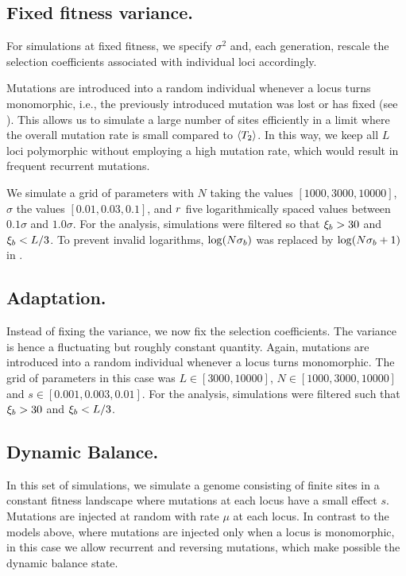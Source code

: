\subsection*{Fixed fitness variance.~}
For simulations at fixed fitness, we specify $\sigma^2$ and, each generation, rescale
the selection coefficients associated with individual loci accordingly.

Mutations are introduced into a random individual whenever a locus
turns monomorphic, i.e., the previously introduced mutation was lost
or has fixed (see \cite{Neher:2011p42539}). This allows us to simulate
a large number of sites efficiently in a limit where the overall
mutation rate is small compared to $\langle T_2\rangle$. In this way, we keep all $L$ loci
polymorphic without employing a high mutation rate, which would result
in frequent recurrent mutations.

We simulate a grid of parameters with $N$ taking the values $[1000,
3000, 10000]$, $\sigma$ the values $[0.01, 0.03, 0.1]$, and $r$ five
logarithmically spaced values between $0.1\sigma$ and $1.0 \sigma$. For the
analysis, simulations were filtered so that ${\xi_b}>30$ and
${\xi_b}<L/3$. To prevent invalid logarithms, $\log(N{\sigma_b})$ was
replaced by $\log(N{\sigma_b}+1)$ in .


\subsection*{Adaptation.~}
Instead of fixing the variance, we now fix the selection
coefficients. The variance is hence a fluctuating but roughly constant
quantity. Again, mutations are introduced into a random individual
whenever a locus turns monomorphic. 
The grid of parameters in this case was $L\in [3000, 10000]$, $N\in
[1000,3000, 10000]$ and $s \in [0.001, 0.003, 0.01]$. For the
analysis, simulations were filtered such that ${\xi_b}>30$ and
${\xi_b}<L/3$. 





\subsection*{Dynamic Balance.~}
In this set of simulations, we simulate a genome consisting of finite sites in a
constant fitness landscape where mutations at each locus have a small
effect $s$. Mutations are injected at random with rate $\mu$ at each
locus. In contrast to the models above, where mutations are injected
only when a locus is monomorphic, in this
case we allow recurrent and reversing mutations, which make possible the dynamic balance state. 

